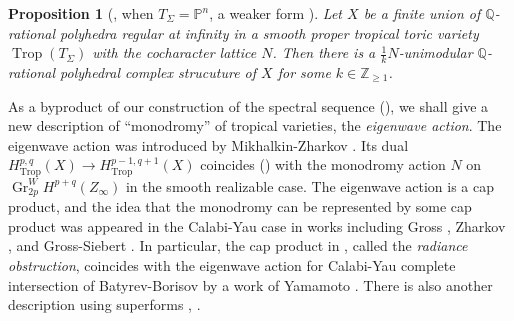 \documentclass[12pt,a4]{amsart}
\newtheorem{prp}[thm]{Proposition}
\def\P{\mathbb{P}}
\def\Z{\mathbb{Z}}
\def\Q{\mathbb{Q}}
\def\Gr{\mathop{\mathrm{Gr}}\nolimits}
\def\Trop{\mathop{\mathrm{trop}}\nolimits}
\def\Trop{\mathop{\mathrm{Trop}}\nolimits}
\def\Gr{\mathop{\mathrm{Gr}}\nolimits}
\numberwithin{equation}{section}
\numberwithin{figure}{section}
\begin{document}
  \begin{prp}[, \cite{ItenbergKatzarkovMikhalkinZharkovTropicalhomology2019}
  when $T_{\Sigma} = \P^n$, 
   a weaker form \cite{AminiPiquerezHodgetheoryfortropicalvarieties2020}]
    \label{intro the existence of unimodular triangulation}
  Let $X$ be a finite union of $\Q$-rational polyhedra  regular at infinity 
  in a smooth proper tropical toric variety $\Trop (T_{\Sigma})$
   with the cocharacter lattice $N $.
   Then there is a
   $\frac{1}{k}N$-unimodular
    $\Q$-rational polyhedral complex strucuture 
    of $X$ 
   for some $k \in \Z_{\geq 1}$. 
  \end{prp}


  As a byproduct of our construction of the spectral sequence 
  (), 
  we shall give 
   a new description of ``monodromy'' of tropical varieties, 
   the \emph{eigenwave action}.
  The eigenwave action was introduced by 
  Mikhalkin-Zharkov \cite[Subsection 5.2]{MikhalkinZharkovTropicaleignewaveandintermediatejacobians2014}.
     Its dual 
   $H^{p,q}_{\Trop} (X ) \to H^{p-1,q+1}_{\Trop}(X)$
    coincides (\cite[Appendix]{MikhalkinZharkovTropicaleignewaveandintermediatejacobians2014})
     with the monodromy action $N$ on
     $ \Gr_{2p}^W H^{p+q} (Z_{\infty})$
     in the smooth realizable case.
   The eigenwave action is a cap product, 
    and the idea that the monodromy can be represented by some cap product  
    was appeared in the Calabi-Yau case 
    in works including Gross \cite{GrossSpecialLagrangianfibrations.I.Topology1998}, 
    Zharkov \cite{ZharkovTorusfibrationsofCalabi-Yauhypersurfacesintoricvarieties2000}, and Gross-Siebert \cite{GrossSiebertMirrorsymmetryvialogarithmicdegenerationdataII2010}.
    In particular, the cap product in \cite{GrossSiebertMirrorsymmetryvialogarithmicdegenerationdataII2010}, 
    called the \emph{radiance obstruction}, 
    coincides with the eigenwave action for Calabi-Yau complete intersection of Batyrev-Borisov 
    by a work of 
    Yamamoto \cite{YamamotoTROPICALCONTRACTIONSTOINTEGRALAFFINEMANIFOLDSWITHSINGULARITIES2021}. 
    There is also another description using superforms \cite{JellTROPICALCOHOMOLOGYWITHINTEGRALCOEFFICIENTSFORANALYTICSPACES2022}, \cite{LiuMonodromymapfortropicalDolbeaultcohomology2019}. 
 
\end{document}
